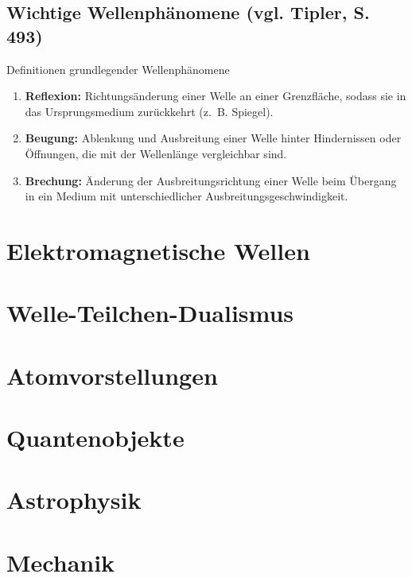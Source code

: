 \documentclass[11pt,a4paper,oneside]{article}
\begin{document}
	
	\subsection*{Wichtige Wellenphänomene (vgl. Tipler, S. 493)}
	
	\begin{theo}{Definitionen grundlegender Wellenphänomene}
		\begin{enumerate}
			\item \textbf{Reflexion:} Richtungsänderung einer Welle an einer Grenzfläche, sodass sie in das Ursprungsmedium zurückkehrt (z.~B. Spiegel).
			\item \textbf{Beugung:} Ablenkung und Ausbreitung einer Welle hinter Hindernissen oder Öffnungen, die mit der Wellenlänge vergleichbar sind.
			\item \textbf{Brechung:} Änderung der Ausbreitungsrichtung einer Welle beim Übergang in ein Medium mit unterschiedlicher Ausbreitungsgeschwindigkeit.
		\end{enumerate}
	\end{theo}
	
	
	\newpage
	
	\section{Elektromagnetische Wellen}

	\section{Welle-Teilchen-Dualismus}
	\section{Atomvorstellungen}
	
	
	\section{Quantenobjekte}
	\section{Astrophysik}
	
	
	\newpage
	
	
	\section{Mechanik}
	
\end{document}
